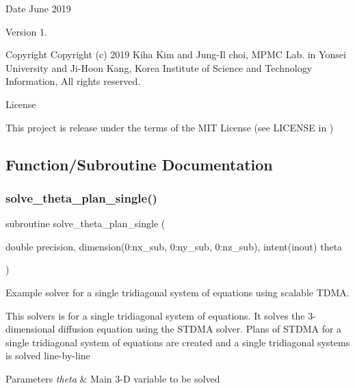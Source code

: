 \begin{DoxyDate}{Date}
June 2019 
\end{DoxyDate}
\begin{DoxyVersion}{Version}
1. 
\end{DoxyVersion}
\begin{DoxyParagraph}{Copyright}
Copyright (c) 2019 Kiha Kim and Jung-\/\+Il choi, M\+P\+MC Lab. in Yonsei University and Ji-\/\+Hoon Kang, Korea Institute of Science and Technology Information, All rights reserved. 
\end{DoxyParagraph}
\begin{DoxyParagraph}{License }

\end{DoxyParagraph}
This project is release under the terms of the M\+IT License (see L\+I\+C\+E\+N\+SE in ) 

\subsection{Function/\+Subroutine Documentation}
\mbox{\label{solve__theta__plan__single_8f90_a53ef6756822306f33a47be6a66232862}} 
\subsubsection{\texorpdfstring{solve\_theta\_plan\_single()}{solve\_theta\_plan\_single()}}
{\footnotesize\ttfamily subroutine solve\+\_\+theta\+\_\+plan\+\_\+single (\begin{DoxyParamCaption}\item[{double precision, dimension(0\+:nx\+\_\+sub, 0\+:ny\+\_\+sub, 0\+:nz\+\_\+sub), intent(inout)}]{theta }\end{DoxyParamCaption})}



Example solver for a single tridiagonal system of equations using scalable T\+D\+MA. 

This solvers is for a single tridiagonal system of equations. It solves the 3-\/dimensional diffusion equation using the S\+T\+D\+MA solver. Plans of S\+T\+D\+MA for a single tridiagonal system of equations are created and a single tridiagonal systems is solved line-\/by-\/line 
\begin{DoxyParams}{Parameters}
{\em theta} & Main 3-\/D variable to be solved \\
\hline
\end{DoxyParams}


